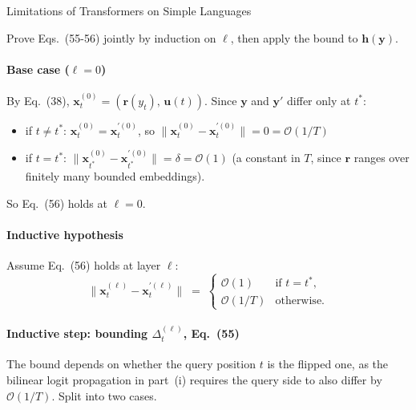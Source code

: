 \begin{question}{Limitations of Transformers on Simple Languages}
\begin{subquestion}
    Prove Eqs.~(55-56) jointly by induction on $\ell$, then apply the bound to $\mathbf{h}(\mathbf{y})$.

    \paragraph{Base case ($\ell = 0$)}
    By Eq.~(38), $\mathbf{x}_t^{(0)} = (\mathbf{r}(y_t),\, \mathbf{u}(t))$. Since $\mathbf{y}$ and $\mathbf{y}'$ differ only at $t^*$:
    \begin{itemize}
        \item if $t \ne t^*$: $\mathbf{x}_t^{(0)} = \mathbf{x}_t^{\prime(0)}$, so $\|\mathbf{x}_t^{(0)} - \mathbf{x}_t^{\prime(0)}\| = 0 = \mathcal{O}(1/T)$
        \item if $t = t^*$: $\|\mathbf{x}_{t^*}^{(0)} - \mathbf{x}_{t^*}^{\prime(0)}\| = \delta = \mathcal{O}(1)$ (a constant in $T$, since $\mathbf{r}$ ranges over finitely many bounded embeddings).
    \end{itemize}
    So Eq.~(56) holds at $\ell = 0$.

    \paragraph{Inductive hypothesis}
    Assume Eq.~(56) holds at layer $\ell$:
    \begin{equation*}
        \|\mathbf{x}_t^{(\ell)} - \mathbf{x}_t^{\prime(\ell)}\| \;=\;
        \begin{cases} \mathcal{O}(1) & \text{if } t = t^*, \\ \mathcal{O}(1/T) & \text{otherwise.} \end{cases}
    \end{equation*}

    \paragraph{Inductive step: bounding $\Delta_t^{(\ell)}$, Eq.~(55)}
    The bound depends on whether the query position $t$ is the flipped one, as the bilinear logit propagation in part~(i) requires the query side to also differ by $\mathcal{O}(1/T)$. 
    Split into two cases.


\end{subquestion}
\end{question}
